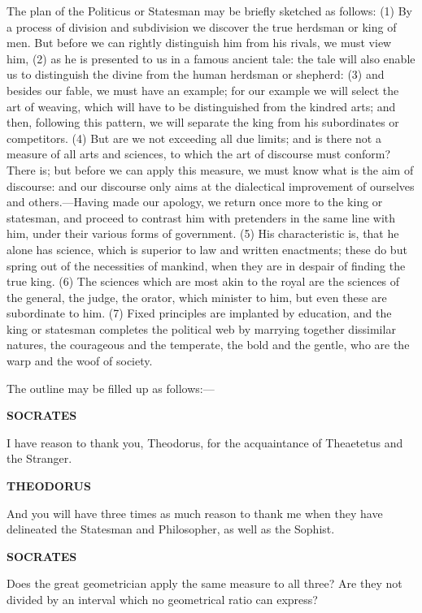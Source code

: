 \documentclass[11pt,letter]{article}
\begin{document}
\par  The plan of the Politicus or Statesman may be briefly sketched as follows: (1) By a process of division and subdivision we discover the true herdsman or king of men. But before we can rightly distinguish him from his rivals, we must view him, (2) as he is presented to us in a famous ancient tale: the tale will also enable us to distinguish the divine from the human herdsman or shepherd: (3) and besides our fable, we must have an example; for our example we will select the art of weaving, which will have to be distinguished from the kindred arts; and then, following this pattern, we will separate the king from his subordinates or competitors. (4) But are we not exceeding all due limits; and is there not a measure of all arts and sciences, to which the art of discourse must conform? There is; but before we can apply this measure, we must know what is the aim of discourse: and our discourse only aims at the dialectical improvement of ourselves and others.—Having made our apology, we return once more to the king or statesman, and proceed to contrast him with pretenders in the same line with him, under their various forms of government. (5) His characteristic is, that he alone has science, which is superior to law and written enactments; these do but spring out of the necessities of mankind, when they are in despair of finding the true king. (6) The sciences which are most akin to the royal are the sciences of the general, the judge, the orator, which minister to him, but even these are subordinate to him. (7) Fixed principles are implanted by education, and the king or statesman completes the political web by marrying together dissimilar natures, the courageous and the temperate, the bold and the gentle, who are the warp and the woof of society.

\par  The outline may be filled up as follows:—

\par \textbf{SOCRATES}
\par   I have reason to thank you, Theodorus, for the acquaintance of Theaetetus and the Stranger.

\par \textbf{THEODORUS}
\par   And you will have three times as much reason to thank me when they have delineated the Statesman and Philosopher, as well as the Sophist.

\par \textbf{SOCRATES}
\par   Does the great geometrician apply the same measure to all three? Are they not divided by an interval which no geometrical ratio can express?
\end{document}
